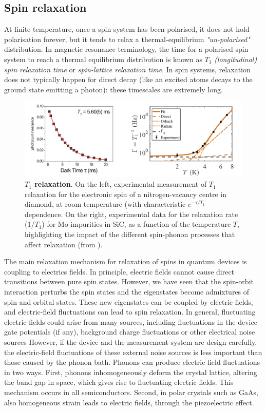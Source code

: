 \documentclass[a4paper,11pt]{article}
\begin{document}
\subsection {Spin relaxation}
At finite temperature, once a spin system has been polarised, it does not hold polarisation forever, but it tends to relax a thermal-equilibrium {\it "un-polarised"} distribution. In magnetic resonance terminology, the time for a polarised spin system to reach a thermal equilibrium distribution is known as $T_1$ {\it (longitudinal) spin relaxation time} or {\it spin-lattice relaxation time}. In spin systems, relaxation does not typically happen for direct decay (like an excited atoms decays to the ground state emitting a photon): these timescales are extremely long.

\begin{figure}[h]
\centering
\includegraphics[width = 1\textwidth]{figures/T1_example.png}
\caption{{\bf $T_1$ relaxation}. On the left, experimental measurement of $T_1$ relaxation for the electronic spin of a nitrogen-vacancy centre in diamond, at room temperature (with characteristic $e^{-\tau/T_1}$ dependence. On the right, experimental data for the relaxation rate ($1/T_1$) for Mo impurities in SiC, as a function of the temperature $T$, highlighting the impact of the different spin-phonon processes that affect relaxation (from \cite{gilardoni_spin-relaxation_2020}).}
\label{fig:T1_exp}
\end{figure}


The main relaxation mechanism for relaxation of spins in quantum devices is coupling to electrics fields. In principle, electric fields cannot cause direct transitions between pure spin states. However, we have seen that the spin-orbit
interaction perturbs the spin states and the eigenstates become admixtures of spin and orbital states. These new eigenstates can be coupled by electric fields, and electric-field fluctuations can lead to spin relaxation. In general, fluctuating electric fields could arise from
many sources, including fluctuations in the device gate potentials (if any), background charge fluctuations or other electrical
noise sources However, if the device and the measurement system are design carefully, the
electric-field fluctuations of these external noise sources is less important than those caused by the phonon bath. Phonons can produce electric-field fluctuations in two ways. First, phonons inhomogeneously deform the crystal lattice, altering the band gap in space, which gives rise to fluctuating electric fields. This mechanism occurs in all semiconductors. Second, in polar crystals such as GaAs, also homogeneous strain leads to electric fields, through the piezoelectric effect.
\end{document}

